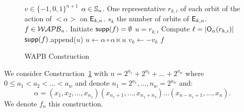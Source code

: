 \documentclass{llncs}
\begin{document}
\begin{figure}[H]
	\begin{algorithmic}[1]			
		\Require $v\in \{-1,0,1\}^{n+1}$ %
		\Require $\alpha \in \mathbb{S}_n$. One representative $r_{k,i}$ of each orbit of the action of $<\alpha>$ on $\mathsf{E}_{k,n}$. $s_k$ the number of orbits of $\mathsf{E}_{k,n}$.
		\Ensure  $f\in \mathcal{WAPB}_{n}$.
		\State Initiate $\mathsf{supp}(f)=\emptyset$ \;
				\State $u=r_{k,i}$ \;
				\State Compute $\ell=|\mathsf{O}_{\alpha}(r_{k,i})|$ \;
					\State  $\mathsf{supp}(f)$.append($u$)\;
					\State  $u \gets \alpha \circ \alpha \ltimes u$\;
					\State $v_k\gets -v_k$ \;
				\EndFor
			\EndFor		
		\EndFor	
		\State  \Return $f$
	\end{algorithmic}
\caption{WAPB Construction~\label{Alg:WAPBconst}}
\end{figure}


We consider Construction~\ref{Alg:WAPBconst} with $n=2^{a_1}+2^{a_2}+\ldots +2^{a_w}$ where $0\le a_1<a_2<\ldots <a_w$ and denote $n_1=2^{a_1},\ldots, n_w=2^{a_w}$ and:
\[\alpha=(x_1,x_2,\ldots,x_{n_1}) (x_{n_1+1},\ldots,x_{n_1+n_2})\ldots  (x_{n-n_1+1},\ldots,x_n).\] 
We denote $f_n$ this construction.
\end{document}

